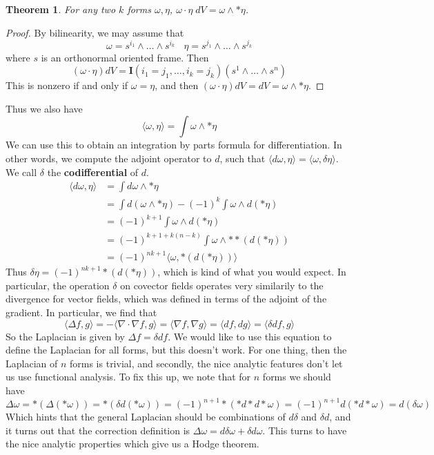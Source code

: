 \documentclass{article}
\theoremstyle{plain}
\newtheorem{theorem}{Theorem}
\theoremstyle{remark}
\theoremstyle{definition}
\begin{document}
\begin{theorem}
    For any two $k$ forms $\omega, \eta$, $\omega \cdot \eta\; dV = \omega \wedge *\eta$.
\end{theorem}
\begin{proof}
    By bilinearity, we may assume that
    \[ \omega = s^{i_1} \wedge \dots \wedge s^{i_k}\ \ \ \ \eta = s^{j_1} \wedge \dots \wedge s^{j_k} \]
    where $s$ is an orthonormal oriented frame. Then
    \[ (\omega \cdot \eta) dV = \mathbf{I}(i_1 = j_1, \dots, i_k = j_k) (s^1 \wedge \dots \wedge s^n) \]
    This is nonzero if and only if $\omega = \eta$, and then $(\omega \cdot \eta) dV = dV = \omega \wedge *\eta$.
\end{proof}

Thus we also have
%
\[ \langle \omega, \eta \rangle = \int \omega \wedge * \eta \]
%
We can use this to obtain an integration by parts formula for differentiation. In other words, we compute the adjoint operator to $d$, such that $\langle d\omega, \eta \rangle = \langle \omega, \delta \eta \rangle$. We call $\delta$ the {\bf codifferential} of $d$.
%
\begin{align*}
    \langle d\omega, \eta \rangle &= \int d\omega \wedge *\eta\\
    &= \int d(\omega \wedge *\eta) - (-1)^k \int \omega \wedge d(* \eta)\\
    &= (-1)^{k+1} \int \omega \wedge d(* \eta)\\
    &= (-1)^{k+1 + k(n-k)} \int \omega \wedge **(d(* \eta))\\
    &= (-1)^{nk+1} \langle \omega, *(d(* \eta)) \rangle
\end{align*}
%
Thus $\delta \eta = (-1)^{nk+1} *(d(* \eta))$, which is kind of what you would expect. In particular, the operation $\delta$ on covector fields operates very similarily to the divergence for vector fields, which was defined in terms of the adjoint of the gradient. In particular, we find that
%
\[ \langle \Delta f, g \rangle = - \langle \nabla \cdot \nabla f, g \rangle = \langle \nabla f, \nabla g \rangle = \langle df, dg \rangle = \langle \delta df, g \rangle \]
%
So the Laplacian is given by $\Delta f = \delta df$. We would like to use this equation to define the Laplacian for all forms, but this doesn't work. For one thing, then the Laplacian of $n$ forms is trivial, and secondly, the nice analytic features don't let us use functional analysis. To fix this up, we note that for $n$ forms we should have
%
\[ \Delta \omega = *(\Delta(* \omega)) = *(\delta d(* \omega)) = (-1)^{n+1} *(* d * d * \omega) = (-1)^{n+1} d(* d * \omega) = d(\delta \omega) \]
%
Which hints that the general Laplacian should be combinations of $d \delta$ and $\delta d$, and it turns out that the correction definition is $\Delta \omega = d \delta \omega + \delta d \omega$. This turns to have the nice analytic properties which give us a Hodge theorem.
\end{document}
